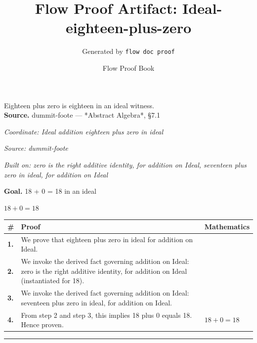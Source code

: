 \documentclass[11pt]{article}
\title{Flow Proof Artifact: Ideal-eighteen-plus-zero}
\author{Generated by \texttt{flow doc proof}}
\date{Flow Proof Book}
\theoremstyle{definition}
\begin{document}
\maketitle
Eighteen plus zero is eighteen in an ideal witness.\\[0.5em]
\textbf{Source.} dummit-foote — *Abstract Algebra*, §7.1\\[0.5em]
\bigskip
{}\par
\smallskip\noindent\textit{Coordinate: Ideal \cdot addition \cdot eighteen plus zero in ideal}\par
\smallskip\noindent\textit{Source: dummit-foote}\par
\smallskip\noindent\textit{Built on: zero is the right additive identity, for addition on Ideal, seventeen plus zero in ideal, for addition on Ideal}\par
\medskip
\noindent\textbf{Goal.} 18 + 0 = 18 in an ideal\par
\noindent$\displaystyle 18 + 0 = 18$\par
\medskip
\noindent
\begin{tabular}{@{} >{\raggedright\arraybackslash}p{} >{\raggedright\arraybackslash}p{} >{\raggedleft\arraybackslash}p{} @{}}
\textbf{\#} & \textbf{Proof} & \textbf{Mathematics} \\
\midrule
\textbf{1.} & We prove that eighteen plus zero in ideal for addition on Ideal. & \\[0.45em]
\textbf{2.} & We invoke the derived fact governing addition on Ideal: zero is the right additive identity, for addition on Ideal (instantiated for 18). & \\[0.45em]
\textbf{3.} & We invoke the derived fact governing addition on Ideal: seventeen plus zero in ideal, for addition on Ideal. & \\[0.45em]
\textbf{4.} & From step 2 and step 3, this implies 18 plus 0 equals 18. Hence proven. & $\displaystyle 18 + 0 = 18$ \\[0.45em]
\bottomrule
\end{tabular}
\label{thm:Ideal-addition-eighteen_plus_zero_in_ideal}
\par\medskip\hrule
\end{document}
